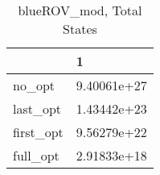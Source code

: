 \begin{table}
\caption{blueROV\_mod, Total States}
\label{blueROV_mod_total}
\begin{tabular}{ll}
\toprule
 & 1 \\
\midrule
no\_opt & 9.40061e+27 \\
last\_opt & 1.43442e+23 \\
first\_opt & 9.56279e+22 \\
full\_opt & 2.91833e+18 \\
\bottomrule
\end{tabular}
\end{table}
